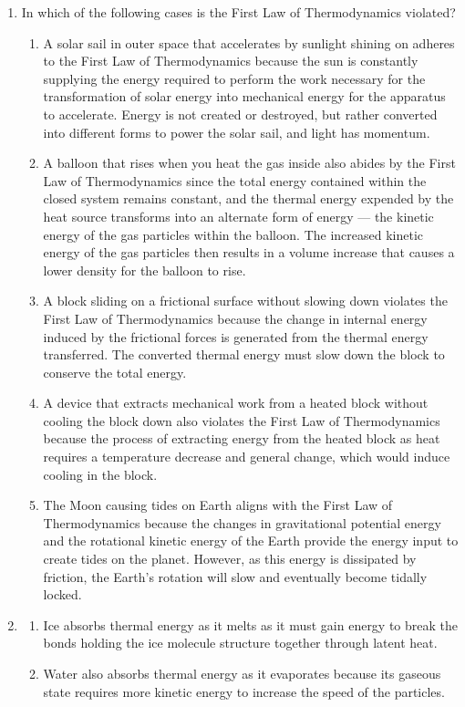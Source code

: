 \documentclass{homework}
\begin{document}
\begin{enumerate}[label=(\alph*)]
    \item In which of the following cases is the First Law of Thermodynamics violated?
    \begin{enumerate}[label=\roman*.]
        \item A solar sail in outer space that accelerates by sunlight shining on adheres to the First Law of Thermodynamics because the sun is constantly supplying the energy required to perform the work necessary for the transformation of solar energy into mechanical energy for the apparatus to accelerate. Energy is not created or destroyed, but rather converted into different forms to power the solar sail, and light has momentum.
        \item A balloon that rises when you heat the gas inside also abides by the First Law of Thermodynamics since the total energy contained within the closed system remains constant, and the thermal energy expended by the heat source transforms into an alternate form of energy — the kinetic energy of the gas particles within the balloon. The increased kinetic energy of the gas particles then results in a volume increase that causes a lower density for the balloon to rise.
        \item A block sliding on a frictional surface without slowing down violates the First Law of Thermodynamics because the change in internal energy induced by the frictional forces is generated from the thermal energy transferred. The converted thermal energy must slow down the block to conserve the total energy.
        \item A device that extracts mechanical work from a heated block without cooling the block down also violates the First Law of Thermodynamics because the process of extracting energy from the heated block as heat requires a temperature decrease and general change, which would induce cooling in the block.
        \item The Moon causing tides on Earth aligns with the First Law of Thermodynamics because the changes in gravitational potential energy and the rotational kinetic energy of the Earth provide the energy input to create tides on the planet. However, as this energy is dissipated by friction, the Earth’s rotation will slow and eventually become tidally locked.
    \end{enumerate}
    \item 
    \begin{enumerate}[label=\roman*.]
        \item Ice absorbs thermal energy as it melts as it must gain energy to break the bonds holding the ice molecule structure together through latent heat.
        \item Water also absorbs thermal energy as it evaporates because its gaseous state requires more kinetic energy to increase the speed of the particles.
    \end{enumerate}
\end{enumerate}
\end{document}
